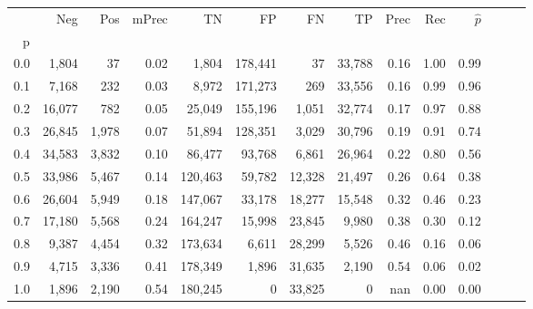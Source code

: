 \begin{tabular}{rrrrrrrrrrrrrr}
\toprule
{} &     Neg &    Pos & mPrec &       TN &       FP &      FN &      TP &  Prec &   Rec & $\hat{p}$ \\
p   &         &        &       &          &          &         &         &       &       &           \\
\midrule
0.0 &   1,804 &     37 &  0.02 &    1,804 &  178,441 &      37 &  33,788 &  0.16 &  1.00 &      0.99 \\
0.1 &   7,168 &    232 &  0.03 &    8,972 &  171,273 &     269 &  33,556 &  0.16 &  0.99 &      0.96 \\
0.2 &  16,077 &    782 &  0.05 &   25,049 &  155,196 &   1,051 &  32,774 &  0.17 &  0.97 &      0.88 \\
0.3 &  26,845 &  1,978 &  0.07 &   51,894 &  128,351 &   3,029 &  30,796 &  0.19 &  0.91 &      0.74 \\
0.4 &  34,583 &  3,832 &  0.10 &   86,477 &   93,768 &   6,861 &  26,964 &  0.22 &  0.80 &      0.56 \\
0.5 &  33,986 &  5,467 &  0.14 &  120,463 &   59,782 &  12,328 &  21,497 &  0.26 &  0.64 &      0.38 \\
0.6 &  26,604 &  5,949 &  0.18 &  147,067 &   33,178 &  18,277 &  15,548 &  0.32 &  0.46 &      0.23 \\
0.7 &  17,180 &  5,568 &  0.24 &  164,247 &   15,998 &  23,845 &   9,980 &  0.38 &  0.30 &      0.12 \\
0.8 &   9,387 &  4,454 &  0.32 &  173,634 &    6,611 &  28,299 &   5,526 &  0.46 &  0.16 &      0.06 \\
0.9 &   4,715 &  3,336 &  0.41 &  178,349 &    1,896 &  31,635 &   2,190 &  0.54 &  0.06 &      0.02 \\
1.0 &   1,896 &  2,190 &  0.54 &  180,245 &        0 &  33,825 &       0 &   nan &  0.00 &      0.00 \\
\bottomrule
\end{tabular}
